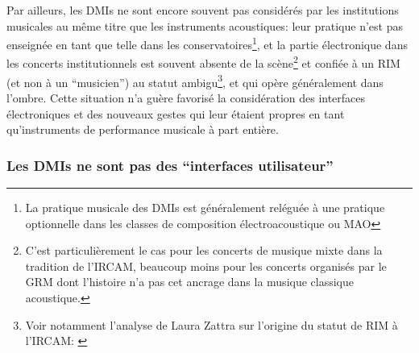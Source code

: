 \noindent Par ailleurs, les \glspl{DMI} ne sont encore souvent pas considérés par les institutions musicales au même titre que les instruments acoustiques: leur pratique n'est pas enseignée en tant que telle dans les conservatoires\footnote{La pratique musicale des \glspl{DMI} est généralement reléguée à une pratique optionnelle dans les classes de composition électroacoustique ou \gls{MAO}}, et la partie électronique dans les concerts institutionnels est souvent absente de la scène\footnote{C'est particulièrement le cas pour les concerts de musique mixte dans la tradition de l'\gls{IRCAM}, beaucoup moins pour les concerts organisés par le \gls{GRM} dont l'histoire n'a pas cet ancrage dans la musique classique acoustique.} et confiée à un \gls{RIM} (et non à un ``musicien'') au statut ambigu\footnote{Voir notamment l'analyse de Laura Zattra sur l'origine du statut de \gls{RIM} à l'\gls{IRCAM}: \cite{zattra_les_2013}}, et qui opère généralement dans l'ombre. Cette situation n'a guère favorisé la considération des interfaces électroniques et des nouveaux gestes qui leur étaient propres en tant qu'instruments de performance musicale à part entière.

\subsubsection{Les DMIs ne sont pas des ``interfaces utilisateur''}

